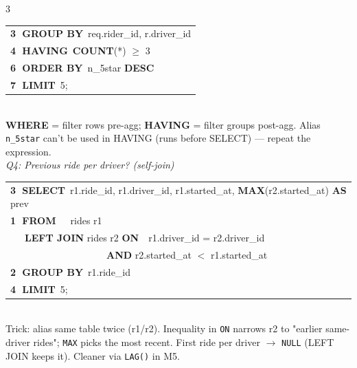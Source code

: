 \documentclass[landscape,letterpaper,9pt]{extarticle}
\begin{document}
\begin{multicols*}{3}
{\begin{minipage}{\dimexpr\linewidth-2pt}
{\begin{tabular}{@{}l@{}}
\textcolor{stepGroup}{\textbf{\textcircled{\scriptsize 3} GROUP BY}~req.rider\_id, r.driver\_id} \\
\textcolor{stepHaving}{\textbf{\textcircled{\scriptsize 4} HAVING}~\textbf{COUNT}(*) $\geq$ 3} \\
\textcolor{stepOrder}{\textbf{\textcircled{\scriptsize 6} ORDER BY}~n\_5star \textbf{DESC}} \\
\textcolor{stepLimit}{\textbf{\textcircled{\scriptsize 7} LIMIT}~5;} \\
\end{tabular}}
\end{minipage}}
\\[1pt]
\textcolor{cmt}{\scriptsize \textbf{WHERE} = filter rows pre-agg; \textbf{HAVING} = filter groups post-agg. Alias \texttt{n\_5star} can't be used in HAVING (runs before SELECT) — repeat the expression.}\\[3pt]
\textit{\scriptsize Q4: Previous ride per driver? (self-join)}\\[1pt]
\colorbox{black!4}{%
\begin{minipage}{\dimexpr\linewidth-2pt}
{\ttfamily\scriptsize
\begin{tabular}{@{}l@{}}
\textcolor{stepGroup}{\textbf{\textcircled{\scriptsize 3} SELECT}~r1.ride\_id, r1.driver\_id, r1.started\_at, \textbf{MAX}(r2.started\_at) \textbf{AS} prev} \\
\textcolor{stepFrom}{\textbf{\textcircled{\scriptsize 1} FROM}~~~rides r1} \\
\textcolor{stepFrom}{~~~\textbf{LEFT JOIN} rides r2 \textbf{ON}~~r1.driver\_id = r2.driver\_id} \\
\textcolor{stepFrom}{~~~~~~~~~~~~~~~~~~~~\textbf{AND} r2.started\_at $<$ r1.started\_at} \\
\textcolor{stepWhere}{\textbf{\textcircled{\scriptsize 2} GROUP BY}~r1.ride\_id} \\
\textcolor{stepHaving}{\textbf{\textcircled{\scriptsize 4} LIMIT}~5;} \\
\end{tabular}}
\end{minipage}}
\\[1pt]
\textcolor{cmt}{\scriptsize Trick: alias same table twice (r1/r2). Inequality in \texttt{ON} narrows r2 to "earlier same-driver rides"; \texttt{MAX} picks the most recent. First ride per driver $\to$ \texttt{NULL} (LEFT JOIN keeps it). Cleaner via \texttt{LAG()} in M5.}


\end{multicols*}
\end{document}
